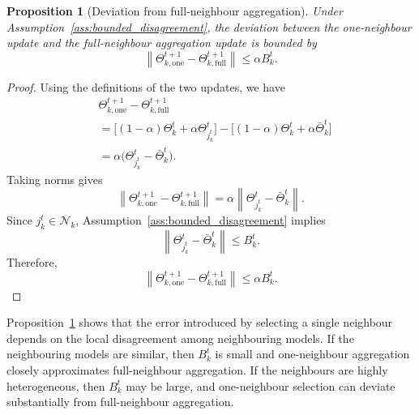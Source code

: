 \documentclass[conference]{IEEEtran}
\newtheorem{proposition}{Proposition}
\begin{document}
\begin{proposition}[Deviation from full-neighbour aggregation]
\label{prop:deviation_full}
Under Assumption~\ref{ass:bounded_disagreement}, the deviation between the one-neighbour update and the full-neighbour aggregation update is bounded by
\begin{equation}
\left\|
\Theta_{k,\mathrm{one}}^{t+1}
-
\Theta_{k,\mathrm{full}}^{t+1}
\right\|
\leq
\alpha B_k^t.
    \label{eq:auto-040}
\end{equation}
\end{proposition}

\begin{proof}
Using the definitions of the two updates, we have
\begin{align}
&\Theta_{k,\mathrm{one}}^{t+1}
-
\Theta_{k,\mathrm{full}}^{t+1} \\
&=\big[(1-\alpha)\Theta_k^t
+\alpha\Theta_{j_k^t}^t\big]
-
\big[(1-\alpha)\Theta_k^t
+\alpha\bar{\Theta}_k^t\big] \\
&=\alpha\big(\Theta_{j_k^t}^t-\bar{\Theta}_k^t\big).
\end{align}
Taking norms gives
\begin{equation}
\left\|
\Theta_{k,\mathrm{one}}^{t+1}
-
\Theta_{k,\mathrm{full}}^{t+1}
\right\|
=
\alpha
\left\|
\Theta_{j_k^t}^t-\bar{\Theta}_k^t
\right\|.
    \label{eq:auto-041}
\end{equation}
Since $j_k^t\in\mathcal{N}_k$, Assumption~\ref{ass:bounded_disagreement} implies
\begin{equation}
\left\|
\Theta_{j_k^t}^t-\bar{\Theta}_k^t
\right\|
\leq B_k^t.
    \label{eq:auto-042}
\end{equation}
Therefore,
\begin{equation}
\left\|
\Theta_{k,\mathrm{one}}^{t+1}
-
\Theta_{k,\mathrm{full}}^{t+1}
\right\|
\leq
\alpha B_k^t.
    \label{eq:auto-043}
\end{equation}
\end{proof}

Proposition~\ref{prop:deviation_full} shows that the error introduced by selecting a single neighbour depends on the local disagreement among neighbouring models. If the neighbouring models are similar, then $B_k^t$ is small and one-neighbour aggregation closely approximates full-neighbour aggregation. If the neighbours are highly heterogeneous, then $B_k^t$ may be large, and one-neighbour selection can deviate substantially from full-neighbour aggregation.
\end{document}
